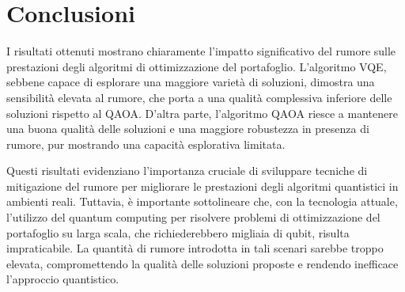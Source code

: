 \section{Conclusioni}\label{sec:conclusion}

I risultati ottenuti mostrano chiaramente l'impatto significativo del rumore sulle prestazioni 
degli algoritmi di ottimizzazione del portafoglio. L'algoritmo VQE, sebbene capace di esplorare 
una maggiore varietà di soluzioni, dimostra una sensibilità elevata al rumore, che porta a una 
qualità complessiva inferiore delle soluzioni rispetto al QAOA. D'altra parte, l'algoritmo QAOA 
riesce a mantenere una buona qualità delle soluzioni e una maggiore robustezza in presenza di rumore, 
pur mostrando una capacità esplorativa limitata.

Questi risultati evidenziano l'importanza cruciale di sviluppare tecniche di mitigazione del rumore 
per migliorare le prestazioni degli algoritmi quantistici in ambienti reali. Tuttavia, è importante 
sottolineare che, con la tecnologia attuale, l'utilizzo del quantum computing per risolvere problemi 
di ottimizzazione del portafoglio su larga scala, che richiederebbero migliaia di qubit, risulta 
impraticabile. La quantità di rumore introdotta in tali scenari sarebbe troppo elevata, compromettendo 
la qualità delle soluzioni proposte e rendendo inefficace l'approccio quantistico.